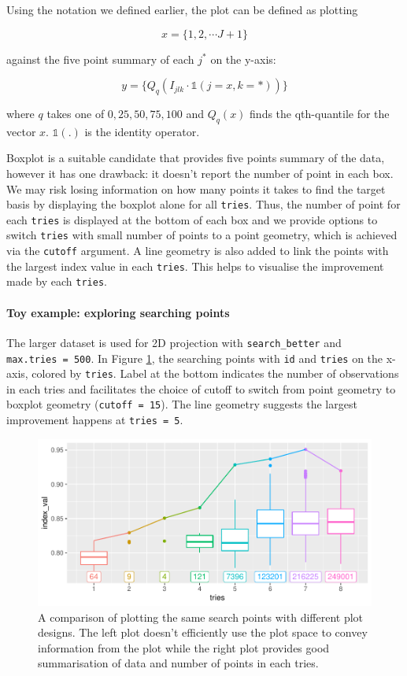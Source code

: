 \documentclass[12pt]{article}
\begin{document}
Using the notation we defined earlier, the plot can be defined as
plotting

\[x = \{1, 2, \cdots J + 1\}\]

against the five point summary of each \(j^*\) on the y-axis:

\[y = \{Q_q(I_{jlk} \cdot \mathds{1} (j = x, k = \ast))\}\]

where \(q\) takes one of \(0, 25, 50, 75, 100\) and \(Q_q(x)\) finds the
qth-quantile for the vector \(x\). \(\mathds{1}(.)\) is the identity
operator.

Boxplot is a suitable candidate that provides five points summary of the
data, however it has one drawback: it doesn't report the number of point
in each box. We may risk losing information on how many points it takes
to find the target basis by displaying the boxplot alone for all
\texttt{tries}. Thus, the number of point for each \texttt{tries} is
displayed at the bottom of each box and we provide options to switch
\texttt{tries} with small number of points to a point geometry, which is
achieved via the \texttt{cutoff} argument. A line geometry is also added
to link the points with the largest index value in each \texttt{tries}.
This helps to visualise the improvement made by each \texttt{tries}.

\hypertarget{toy-example-exploring-searching-points}{%
\paragraph{Toy example: exploring searching
points}\label{toy-example-exploring-searching-points}}

The larger dataset is used for 2D projection with
\texttt{search\_better} and \texttt{max.tries\ =\ 500}. In Figure
\ref{points}, the searching points with \texttt{id} and \texttt{tries}
on the x-axis, colored by \texttt{tries}. Label at the bottom indicates
the number of observations in each tries and facilitates the choice of
cutoff to switch from point geometry to boxplot geometry
(\texttt{cutoff\ =\ 15}). The line geometry suggests the largest
improvement happens at \texttt{tries\ =\ 5}.

\begin{figure}
\centering
\includegraphics{paper_files/figure-latex/points-tries-1.pdf}
\caption{\label{points}A comparison of plotting the same search points
with different plot designs. The left plot doesn't efficiently use the
plot space to convey information from the plot while the right plot
provides good summarisation of data and number of points in each tries.}
\end{figure}
\end{document}
